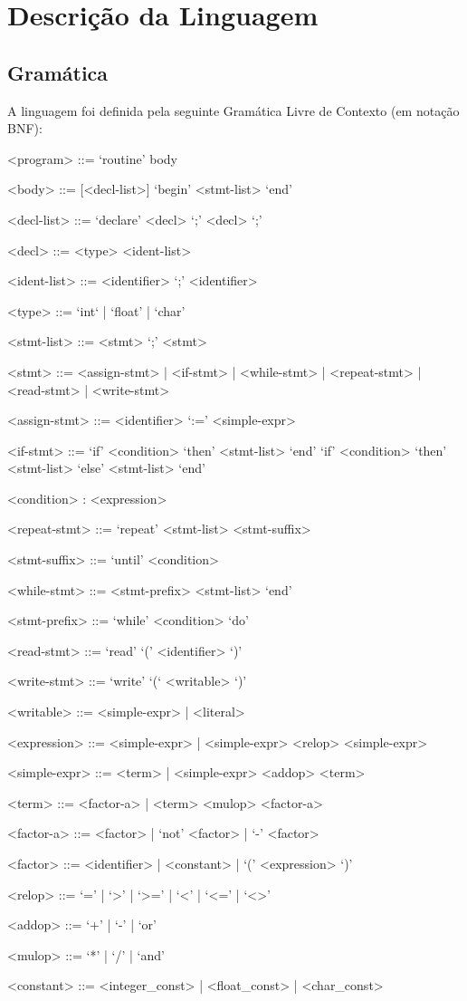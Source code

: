 \chapter{Descrição da Linguagem}
\label{cap:descricaoLinguagem}

\section{Gramática}
\label{sec:gramatica}

A linguagem foi definida pela seguinte Gramática Livre de Contexto (em notação BNF):

\begin{grammar}

<program> ::= `routine' body

<body> ::= [<decl-list>] `begin' <stmt-list> `end'

<decl-list> ::= `declare' <decl> `;' {<decl> `;'}

<decl> ::= <type> <ident-list>

<ident-list> ::= <identifier> {`;' <identifier>}

<type> ::= `int` | `float' | `char'

<stmt-list> ::= <stmt> {`;' <stmt>}

<stmt> ::= <assign-stmt> | <if-stmt> | <while-stmt> | <repeat-stmt> | <read-stmt> | <write-stmt>

<assign-stmt> ::= <identifier> `:=' <simple-expr>

<if-stmt> ::= `if' <condition> `then' <stmt-list> `end'
              \alt `if' <condition> `then' <stmt-list> `else' <stmt-list> `end'
              
<condition> : <expression>

<repeat-stmt> ::= `repeat' <stmt-list> <stmt-suffix>

<stmt-suffix> ::= `until' <condition>

<while-stmt> ::= <stmt-prefix> <stmt-list> `end'

<stmt-prefix> ::= `while' <condition> `do'

<read-stmt> ::= `read' `(' <identifier> `)'

<write-stmt> ::= `write' `(` <writable> `)'

<writable> ::= <simple-expr> | <literal>

<expression> ::= <simple-expr> | <simple-expr> <relop> <simple-expr>

<simple-expr> ::= <term> | <simple-expr> <addop> <term>

<term> ::= <factor-a> | <term> <mulop> <factor-a>

<factor-a> ::= <factor> | `not' <factor> | `-' <factor>

<factor> ::= <identifier> | <constant> | `(' <expression> `)'

<relop> ::= `=' | `>' | `>=' | `<' | `<=' | `<>'

<addop> ::= `+' | `-' | `or'

<mulop> ::= `*' | `/' | `and'

<constant> ::= <integer_const> | <float_const> | <char_const>

\end{grammar}

